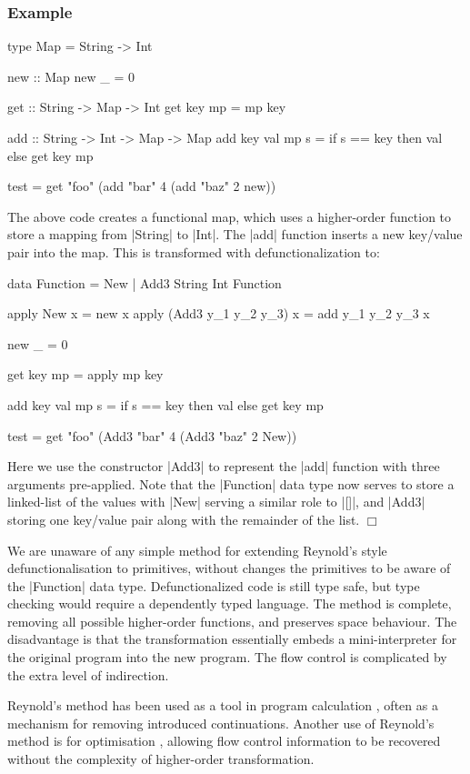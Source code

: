 \documentclass[preprint]{sigplanconf}
\let\cite=\citep
\newcounter{exmp}
\newenvironment{exampleany}[1]
    {\subsubsection*{Example #1}}
    {\hfill$\Box$}
\newenvironment{example}
    {\refstepcounter{exmp}
     \begin{exampleany}{\arabic{exmp}}}
    {\end{exampleany}}
\begin{document}
\begin{example}
\begin{code}
type Map = String -> Int

new :: Map
new _ = 0

get :: String -> Map -> Int
get key mp = mp key

add :: String -> Int -> Map -> Map
add key val mp s = if s == key then val else get key mp

test = get "foo" (add "bar" 4 (add "baz" 2 new))
\end{code}

\noindent The above code creates a functional map, which uses a higher-order function to store a mapping from |String| to |Int|. The |add| function inserts a new key/value pair into the map. This is transformed with defunctionalization to:

\begin{code}
data Function  =  New
               |  Add3 String Int Function

apply  New                 x = new x
apply  (Add3 y_1 y_2 y_3)  x = add y_1 y_2 y_3 x

new _ = 0

get key mp = apply mp key

add key val mp s = if s == key then val else get key mp

test = get "foo" (Add3 "bar" 4 (Add3 "baz" 2 New))
\end{code}

Here we use the constructor |Add3| to represent the |add| function with three arguments pre-applied. Note that the |Function| data type now serves to store a linked-list of the values with |New| serving a similar role to |[]|, and |Add3| storing one key/value pair along with the remainder of the list.
\end{example}

We are unaware of any simple method for extending Reynold's style defunctionalisation to primitives, without changes the primitives to be aware of the |Function| data type. Defunctionalized code is still type safe, but type checking would require a dependently typed language. The method is complete, removing all possible higher-order functions, and preserves space behaviour. The disadvantage is that the transformation essentially embeds a mini-interpreter for the original program into the new program. The flow control is complicated by the extra level of indirection.

Reynold's method has been used as a tool in program calculation \cite{graham_hutton_calculating_an_exceptional_machine, another_one, another_one}, often as a mechanism for removing introduced continuations. Another use of Reynold's method is for optimisation \cite{grin,jhc}, allowing flow control information to be recovered without the complexity of higher-order transformation.
\end{document}
